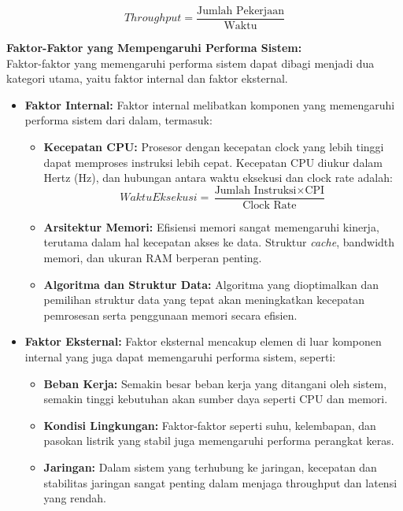 \documentclass[12pt]{article}
\begin{document}
\[
Throughput = \frac{\text{Jumlah Pekerjaan}}{\text{Waktu}}
\]

\textbf{Faktor-Faktor yang Mempengaruhi Performa Sistem:} \\
Faktor-faktor yang memengaruhi performa sistem dapat dibagi menjadi dua kategori utama, yaitu faktor internal dan faktor eksternal.

\begin{itemize}
    \item \textbf{Faktor Internal:} Faktor internal melibatkan komponen yang memengaruhi performa sistem dari dalam, termasuk:
    \begin{itemize}
        \item \textbf{Kecepatan CPU:} Prosesor dengan kecepatan clock yang lebih tinggi dapat memproses instruksi lebih cepat. Kecepatan CPU diukur dalam Hertz (Hz), dan hubungan antara waktu eksekusi dan clock rate adalah:
        \[
        Waktu Eksekusi = \frac{\text{Jumlah Instruksi} \times \text{CPI}}{\text{Clock Rate}}
        \]
        \item \textbf{Arsitektur Memori:} Efisiensi memori sangat memengaruhi kinerja, terutama dalam hal kecepatan akses ke data. Struktur \textit{cache}, bandwidth memori, dan ukuran RAM berperan penting.
        \item \textbf{Algoritma dan Struktur Data:} Algoritma yang dioptimalkan dan pemilihan struktur data yang tepat akan meningkatkan kecepatan pemrosesan serta penggunaan memori secara efisien.
    \end{itemize}
    
    \item \textbf{Faktor Eksternal:} Faktor eksternal mencakup elemen di luar komponen internal yang juga dapat memengaruhi performa sistem, seperti:
    \begin{itemize}
        \item \textbf{Beban Kerja:} Semakin besar beban kerja yang ditangani oleh sistem, semakin tinggi kebutuhan akan sumber daya seperti CPU dan memori.
        \item \textbf{Kondisi Lingkungan:} Faktor-faktor seperti suhu, kelembapan, dan pasokan listrik yang stabil juga memengaruhi performa perangkat keras.
        \item \textbf{Jaringan:} Dalam sistem yang terhubung ke jaringan, kecepatan dan stabilitas jaringan sangat penting dalam menjaga throughput dan latensi yang rendah.
    \end{itemize}
\end{itemize}
\end{document}
